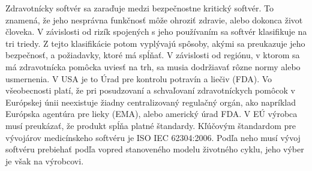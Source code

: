 \documentclass[10pt,twoside,slovak,a4paper]{article}
\begin{document}
Zdravotnícky softvér sa zaraďuje medzi bezpečnostne kritický softvér. To znamená, že jeho nesprávna funkčnosť môže ohroziť zdravie, alebo dokonca život človeka. V závislosti od rizík spojených s jeho používaním sa softvér klasifikuje na tri triedy. Z tejto klasifikácie potom vyplývajú spôsoby, akými sa preukazuje jeho bezpečnosť, a požiadavky, ktoré má spĺňať. V závislosti od regiónu, v ktorom sa má zdravotnícka pomôcka uviesť na trh, sa musia dodržiavať rôzne normy alebo usmernenia. V USA je to Úrad pre kontrolu potravín a liečiv (FDA). Vo všeobecnosti platí, že pri posudzovaní a schvaľovaní zdravotníckych pomôcok v Európskej únii neexistuje žiadny centralizovaný regulačný orgán, ako napríklad Európska agentúra pre lieky (EMA), alebo americký úrad FDA. V EÚ výrobca musí preukázať, že produkt spĺňa platné štandardy. Kľúčovým štandardom pre vývojárov medicínskeho softvéru je ISO IEC 62304:2006. Podľa neho musí vývoj softvéru prebiehať podľa vopred stanoveného modelu životného cyklu, jeho výber je však na výrobcovi\cite{bronneke2021}.
\end{document}

